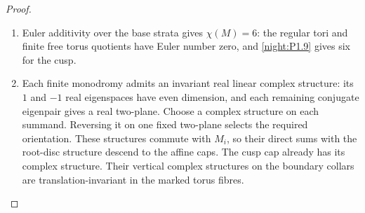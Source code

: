 \begin{proof}
\begin{enumerate}[label=\arabic*.,leftmargin=*]
We also record the invariant normal closure needed below. Let
$K$ be the smallest $\langle M_1,M_2\rangle$-invariant subgroup
containing $(M_0-I)\Lambda$, and let
$J=(M_1-I)\Lambda+(M_2-I)\Lambda=\ker\ell$.
The equality $\ell M_i=\ell$ gives $K\subseteq\ker\ell$.
On the abelian quotient $\Lambda/K$, the induced maps $a,b$
satisfy $ab=1$, $a^5=1$ and $b^4=1$. Thus $a^4=a^5=1$, so
$a=b=1$ and $J\subseteq K$. Consequently $K=J=\ker\ell$ as
integral subgroups.


Let $a_i$ be the two finite peripheral lifts. The universal covering
deck transformation of the $i$th cap has $m_i$th power equal to
translation by $v_i$, since $M_iv_i=v_i$. The collar map in
Step~1 sends $a_i$ to that transformation. Van Kampen therefore gives
\[
 a_i\lambda a_i^{-1}=M_i\lambda,
 \qquad a_1^5=v_1,\quad a_2^4=v_2,\quad a_1a_2=1.
\]
Write $a_1=t$ and $a_2=t^{-1}$. Then
$t=t^5t^{-4}=v_1+v_2$ lies in the abelian fibre subgroup. Conjugation
is consequently trivial, and that subgroup is a quotient of
$\Lambda_{\langle M_1,M_2\rangle}=\mathbb Z$, with coordinate $\ell$.
Now $\ell(v_1+v_2)=0$, so $t=0$, while $t^5=v_1$ kills its generator
$\ell(v_1)=1$. Every generator vanishes, proving $\pi_1=1$.
Equivalently, after this abelian reduction, the relations on
$(\ell,a_1,a_2)$ have matrix
\[
 \begin{pmatrix}-1&5&0\\1&0&4\\0&1&1\end{pmatrix},
 \qquad\det=-1.
\]

\item Euler additivity over the base strata gives $\chi(M)=6$:
the regular tori and finite free torus quotients have Euler number
zero, and \cref{night:P1.9} gives six for the cusp.
\item Each finite monodromy admits an invariant real linear complex
structure: its $1$ and $-1$ real eigenspaces have even dimension, and
each remaining conjugate eigenpair gives a real two-plane. Choose
a complex structure on each summand. Reversing it on one fixed
two-plane selects the required orientation. These structures commute
with $M_i$, so their direct sums with the root-disc structure descend
to the affine caps. The cusp cap already has its complex
structure. Their vertical complex structures on the boundary collars
are translation-invariant in the marked torus fibres.


\end{enumerate}
\end{proof}
